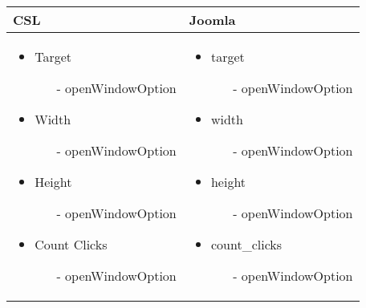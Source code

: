 \begin{minipage}{0.7\textwidth}
\begin{tabular}{|p{} | p{}|}
\hline
\textbf{CSL} & \textbf{Joomla} \\ 
\hline
\begin{itemize}
\item Target
	   \begin{enumerate}
	     \item[-] openWindowOption
	   \end{enumerate}
\item Width
	\begin{enumerate}
		\item[-] openWindowOption
	  \end{enumerate}
\item Height
	\begin{enumerate}
		\item[-] openWindowOption
	   \end{enumerate}
\item Count Clicks
	\begin{enumerate}
		\item[-] openWindowOption
	   \end{enumerate}
\end{itemize}
 & 
\begin{itemize}
\item target
		\begin{enumerate}
			\item[-] openWindowOption
	   \end{enumerate}
\item width
		\begin{enumerate}
			\item[-] openWindowOption
	   \end{enumerate}
\item height
		\begin{enumerate}
			\item[-] openWindowOption
	   \end{enumerate}
\item count\_clicks
		\begin{enumerate}
			\item[-] openWindowOption
	   \end{enumerate}
\end{itemize}
\\
\hline
\end{tabular}
\end{minipage}

